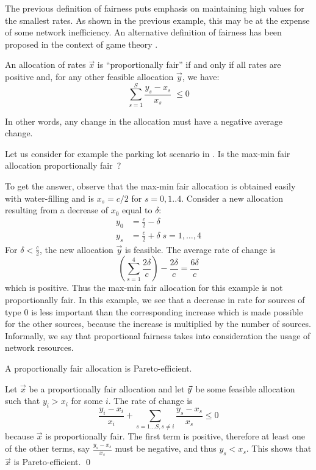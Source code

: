 
The previous definition of fairness puts emphasis on
maintaining high values for the smallest rates. As shown in
the previous example, this may be at the expense of some
network inefficiency. An alternative definition of fairness
has been proposed in the context of game theory \cite{MMD91}.

\begin{definition}
An allocation of rates $\vec{x}$ is ``proportionally fair'' if and only if all rates are positive and, for any other feasible allocation $\vec{y}$, we
have:
$$
\sum_{s=1}^S \frac{y_{s}-x_{s}}{x_{s}} \; \leq 0
$$
        \label{def-pf}
\end{definition}

In other words, any change in the allocation must have a
negative average change.



Let us consider for example the
parking lot scenario in . Is the
max-min fair allocation proportionally fair~?


\begin{figure}[htbp]
        \protect\label{D31-f3p}
\end{figure}



To get the answer, observe that the max-min fair
allocation is obtained easily with water-filling and is $x_{s}=c/2$ for $s=0,1..4$. Consider a new allocation
resulting from a decrease of $x_{0}$ equal to $\delta$:
\begin{eqnarray*}
         y_{0}  &= \frac{c}{2} - \delta \\
        y_{s} &= \frac{c}{2} + \delta \; s=1,\ldots,4
\end{eqnarray*}
For $\delta<\frac{c}{2}$, the new allocation $\vec{y}$ is
feasible. The average rate of change is
$$
\left( \sum_{s=1}^4 \frac{2 \delta }{ c} \right)
 -  \frac{2 \delta }{ c} =
\frac{6\delta }{c}
$$
which is positive.  Thus the max-min fair
allocation for this example is not proportionally fair.  In this example, we see that a decrease in rate for
sources of type $0$ is less important than the corresponding
increase which is made possible for the other sources, because
the increase is multiplied by the number of sources.
Informally, we say that proportional fairness takes into
consideration the usage of network resources.

\begin{theorem}A proportionally fair allocation is Pareto-efficient.
\end{theorem}
\pr Let $\vec{x}$ be a proportionally fair allocation and let $\vec{y}$ be some feasible allocation such that $y_i>x_i$ for some $i$. The rate of change is
$$
\frac{y_i-x_i}{x_i}+\sum_{s=1...S, s\neq i}\frac{y_s-x_s}{x_s}\leq 0
$$ because $\vec{x}$ is proportionally fair. The first term is positive, therefore at least one of the other terms, say $\frac{y_s-x_s}{x_s}$ must be negative, and thus $y_s<x_s$. This shows that $\vec{x}$ is Pareto-efficient.
\qed


